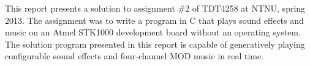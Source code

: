 This report presents a solution to assignment \#2 of TDT4258 at NTNU, spring 2013.
The assignment was to write a program in C that plays sound effects and music on an Atmel STK1000 development board without an operating system.
The solution program presented in this report is capable of generatively playing configurable sound effects and four-channel MOD music in real time.
